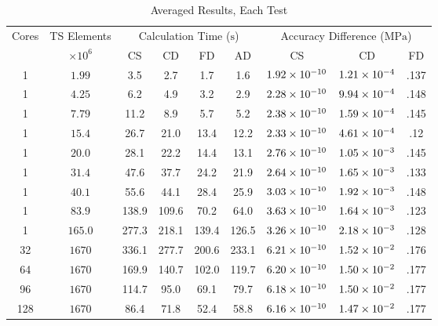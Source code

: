 \documentclass[preprint,12pt]{elsarticle}
\providecommand{\DIFaddbegin}{} %
\providecommand{\DIFdelend}{} %
\providecommand{\DIFaddendFL}{} %
\begin{document}
\DIFdelend \DIFaddbegin \begin{table}[!tbp]    
  \scriptsize
  \DIFaddendFL \centering
        \caption{Averaged Results, Each Test} \label{tab:results}   
       \begin{tabular}{c c c c c c c c c}
         \toprule
         Cores & TS Elements & \multicolumn{4}{c}{Calculation Time ($\si{\second}$)} & \multicolumn{3}{c}{Accuracy Difference ($\si{\mega\pascal}$)} \\ 
         & $\times 10^6$ & CS & CD & FD & AD & CS & CD & FD \\
        \midrule
        1 & $\num{1.99}$  & 3.5 & 2.7 & 1.7 & 1.6 & $\num{1.92E-10}$ & $\num{1.21E-4}$ & .137 \\
        1 & $\num{4.25}$  & 6.2& 4.9& 3.2& 2.9 & $\num{2.28E-10}$ & $\num{9.94E-4}$ & .148 \\
        1 & $\num{7.79}$  & 11.2& 8.9& 5.7& 5.2 & $\num{2.38E-10}$ & $\num{1.59E-4}$ & .145\\
        1 & $\num{15.4}$  & 26.7& 21.0& 13.4& 12.2 & $\num{2.33E-10}$ & $\num{4.61E-4}$ & .12 \\
        1 & $\num{20.0}$  & 28.1& 22.2& 14.4& 13.1 & $\num{2.76E-10}$ & $\num{1.05E-3}$ & .145 \\
        1 & $\num{31.4}$  & 47.6& 37.7& 24.2& 21.9 & $\num{2.64E-10}$ & $\num{1.65E-3}$ & .133 \\
        1 & $\num{40.1}$  & 55.6& 44.1& 28.4& 25.9 & $\num{3.03E-10}$ & $\num{1.92E-3}$ & .148 \\
        1 & $\num{83.9}$  & 138.9& 109.6& 70.2& 64.0 & $\num{3.63E-10}$ & $\num{1.64E-3}$ & .123 \\
        1 & $\num{165.0}$  & 277.3& 218.1& 139.4& 126.5 & $\num{3.26E-10}$ & $\num{2.18E-3}$ & .128 \\
        32 & $\num{1670}$  & 336.1& 277.7& 200.6& 233.1 & $\num{6.21E-10}$ & $\num{1.52E-2}$ & .176 \\
        64 & $\num{1670}$  & 169.9& 140.7& 102.0& 119.7 & $\num{6.20E-10}$ & $\num{1.50E-2}$ & .177 \\
        96 & $\num{1670}$  & 114.7& 95.0& 69.1 & 79.7 & $\num{6.18E-10}$ & $\num{1.50E-2}$ & .177 \\
        128 & $\num{1670}$  & 86.4& 71.8& 52.4 &58.8 & $\num{6.16E-10}$ & $\num{1.47E-2}$ & .177 \\
        \bottomrule
    \end{tabular}
\end{table}
\end{document}
